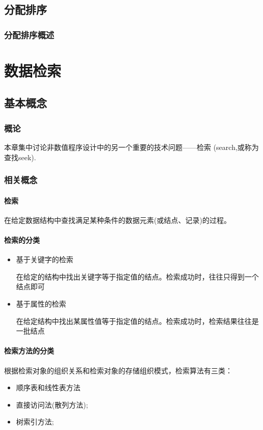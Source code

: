 \documentclass[AutoFakeBold]{LZUThesis2007}
\begin{document}
	\section{分配排序}
		\subsection{分配排序概述}	

\chapter{数据检索}
	\section{基本概念}
		\subsection{概论}
本章集中讨论非数值程序设计中的另一个重要的技术问题——检索 (search,或称为查找seek).
		\subsection{相关概念}
			\subsubsection{检索}
在给定数据结构中查找满足某种条件的数据元素(或结点、记录)的过程。

			\subsubsection{检索的分类}
\begin{itemize}
	\item 基于关键字的检索

在给定的结构中找出关键字等于指定值的结点。检索成功时，往往只得到一个结点即可
	\item 基于属性的检索

在给定结构中找出某属性值等于指定值的结点。检索成功时，检索结果往往是一批结点

\end{itemize}

			\subsubsection{检索方法的分类}
根据检索对象的组织关系和检索对象的存储组织模式，检索算法有三类：
\begin{itemize}
	\item 顺序表和线性表方法
	\item 直接访问法(散列方法);
	\item 树索引方法;


\end{itemize}
\end{document}
